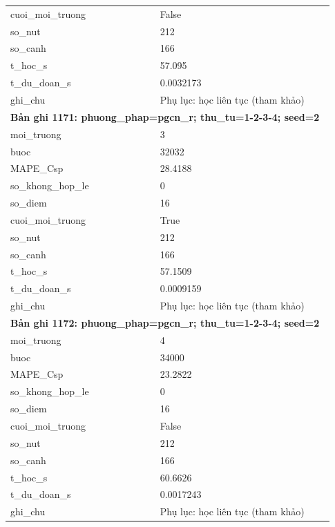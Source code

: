 \begin{longtable}{p{0.43\linewidth}p{0.50\linewidth}}
cuoi\_\allowbreak moi\_\allowbreak truong & False \\
so\_\allowbreak nut & 212 \\
so\_\allowbreak canh & 166 \\
t\_\allowbreak hoc\_\allowbreak s & 57.095 \\
t\_\allowbreak du\_\allowbreak doan\_\allowbreak s & 0.0032173 \\
ghi\_\allowbreak chu & Phụ lục: học liên tục (tham khảo) \\
\midrule
\multicolumn{2}{p{0.95\linewidth}}{\textbf{Bản ghi 1171: phuong\_phap=pgcn\_r; thu\_tu=1-2-3-4; seed=2}} \\
moi\_\allowbreak truong & 3 \\
buoc & 32032 \\
MAPE\_\allowbreak Csp & 28.4188 \\
so\_\allowbreak khong\_\allowbreak hop\_\allowbreak le & 0 \\
so\_\allowbreak diem & 16 \\
cuoi\_\allowbreak moi\_\allowbreak truong & True \\
so\_\allowbreak nut & 212 \\
so\_\allowbreak canh & 166 \\
t\_\allowbreak hoc\_\allowbreak s & 57.1509 \\
t\_\allowbreak du\_\allowbreak doan\_\allowbreak s & 0.0009159 \\
ghi\_\allowbreak chu & Phụ lục: học liên tục (tham khảo) \\
\midrule
\multicolumn{2}{p{0.95\linewidth}}{\textbf{Bản ghi 1172: phuong\_phap=pgcn\_r; thu\_tu=1-2-3-4; seed=2}} \\
moi\_\allowbreak truong & 4 \\
buoc & 34000 \\
MAPE\_\allowbreak Csp & 23.2822 \\
so\_\allowbreak khong\_\allowbreak hop\_\allowbreak le & 0 \\
so\_\allowbreak diem & 16 \\
cuoi\_\allowbreak moi\_\allowbreak truong & False \\
so\_\allowbreak nut & 212 \\
so\_\allowbreak canh & 166 \\
t\_\allowbreak hoc\_\allowbreak s & 60.6626 \\
t\_\allowbreak du\_\allowbreak doan\_\allowbreak s & 0.0017243 \\
ghi\_\allowbreak chu & Phụ lục: học liên tục (tham khảo) \\

\end{longtable}
